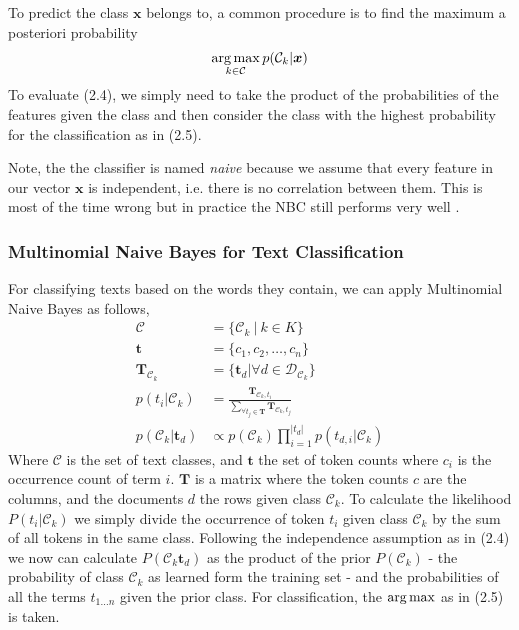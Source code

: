 To predict the class $\boldsymbol{x}$ belongs to, a common procedure is to find the maximum a posteriori probability
\begin{gather}
  \operatorname*{arg\,max}_{k \in \mathcal{C}} p(\mathcal{C}_k|\boldsymbol{x})
\end{gather}
To evaluate (2.4), we simply need to take the product of the probabilities of the features given the class and then consider the class with the highest probability for the classification as in (2.5).

Note, the the classifier is named \textsl{naive} because we assume that every feature in our vector $\boldsymbol{x}$ is independent, i.e. there is no correlation between them. This is most of the time  wrong but in practice the NBC still performs very well \citep{Rish2001}.


\subsubsection{Multinomial Naive Bayes for Text Classification}
For classifying texts based on the words they contain, we can apply Multinomial Naive Bayes as follows,
\begin{align}
  \mathcal{C} &= \{\mathcal{C}_k \: | \: k \in K \} \\
  \boldsymbol{t} &= \{c_1, c_2, \dots, c_n\} \\
  \boldsymbol{T}_{\mathcal{C}_k} &= \{\boldsymbol{t}_d | \forall d \in \mathcal{D}_{\mathcal{C}_{k}}\} \\
  p({t_{i}}|\mathcal{C}_k) &= \frac{\boldsymbol{T}_{\mathcal{C}_k,t_{i}}}{\sum_{\forall t_j \in \boldsymbol{T}}\boldsymbol{T}_{\mathcal{C}_k,t_j}} \\
  p(\mathcal{C}_k|\boldsymbol{t}_d) &\propto p(\mathcal{C}_k) \prod_{i=1}^{|t_{d}|}  p(t_{d,i}|\mathcal{C}_k)
\end{align}
Where $\mathcal{C}$ is the set of text classes, and $\boldsymbol{t}$ the set of token counts where $c_i$ is the occurrence count of term $i$. $\boldsymbol{T}$ is a matrix where the token counts $c$ are the columns, and the documents $d$ the rows given class $\mathcal{C}_k$. To calculate the likelihood $P({t_{i}}|\mathcal{C}_k)$ we simply divide the occurrence of token $t_i$ given class $\mathcal{C}_k$ by the sum of all tokens in the same class. Following the independence assumption as in (2.4) we now can calculate $P(\mathcal{C}_k\boldsymbol{t}_d)$ as the product of the prior $P(\mathcal{C}_k)$ - the probability of class $\mathcal{C}_k$
as learned form the training set - and the probabilities of all the terms $t_{1 \dots n}$ given the prior class. For classification, the $\operatorname*{arg\,max}$ as in (2.5) is taken.

